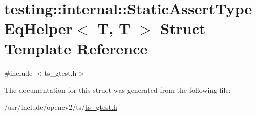 \hypertarget{structtesting_1_1internal_1_1StaticAssertTypeEqHelper_3_01T_00_01T_01_4}{\section{testing\-:\-:internal\-:\-:Static\-Assert\-Type\-Eq\-Helper$<$ T, T $>$ Struct Template Reference}
\label{structtesting_1_1internal_1_1StaticAssertTypeEqHelper_3_01T_00_01T_01_4}
}


{\ttfamily \#include $<$ts\-\_\-gtest.\-h$>$}



The documentation for this struct was generated from the following file\-:\begin{DoxyCompactItemize}
\item 
/usr/include/opencv2/ts/\hyperlink{ts__gtest_8h}{ts\-\_\-gtest.\-h}\end{DoxyCompactItemize}
